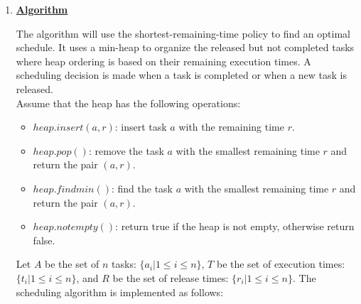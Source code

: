 \documentclass[11pt]{article}
\begin{document}
\begin{enumerate}
\begin{enumerate}
\begin{proof}
  By induction on the number of iterations, when the algorithm
  terminates, $A$ is still a prefix-subsequence of an optimal schedule
  sequence. And when the algorithm terminates, $A$ would contain all
  $n$ tasks, no other schedule sequence can properly contain $A$, thus
  $A$ is the optimal schedule sequence.
\end{proof}

\item %

\underline{\textbf{Algorithm}}

The algorithm will use the shortest-remaining-time policy to find an
optimal schedule. It uses a min-heap to organize the released but not
completed tasks where heap ordering is based on their remaining
execution times. A scheduling decision is made when a task is
completed or when a new task is released.\\

Assume that the heap has the following operations:
\begin{itemize}
\item $heap.insert(a,r)$: insert task $a$ with the remaining time $r$.
\item $heap.pop()$: remove the task $a$ with the smallest remaining
  time $r$ and return the pair $(a,r)$.
\item $heap.findmin()$: find the task $a$ with the smallest remaining
  time $r$ and return the pair $(a,r)$.
\item $heap.notempty()$: return true if the heap is not empty,
  otherwise return false.\\
\end{itemize}

Let $A$ be the set of $n$ tasks: $\{a_i | 1 \leq i \leq n\}$, $T$ be
the set of execution times: $\{t_i | 1 \leq i \leq n\}$, and $R$ be the 
set of release times: $\{r_i | 1 \leq i \leq n\}$. The scheduling
algorithm is implemented as
follows:\\\\\\\\\\\\\\\\\\\\\\\\\\\\\\\\\\\\\\\\\\\\\\\\\\\\


\end{enumerate}
\end{enumerate}
\end{document}
